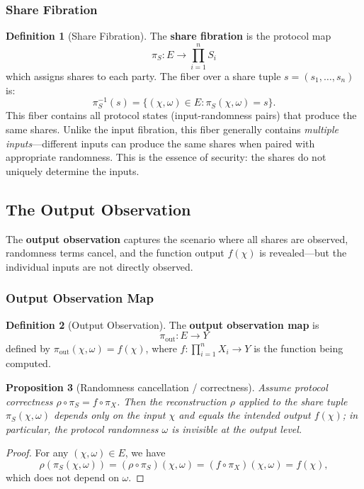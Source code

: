 \documentclass[11pt,a4paper]{article}
\theoremstyle{definition}
\newtheorem{definition}{Definition}[section]
\theoremstyle{plain}
\newtheorem{proposition}[definition]{Proposition}
\begin{document}
\subsubsection{Share Fibration}
\begin{definition}[Share Fibration]
\label{def:share-fibration}
The \textbf{share fibration} is the protocol map
\[
\pi_S: E \longrightarrow \prod_{i=1}^n S_i
\]
which assigns shares to each party. The fiber over a share tuple $s = (s_1, \ldots, s_n)$ is:
\[
\pi_S^{-1}(s) = \{(\chi, \omega) \in E : \pi_S(\chi, \omega) = s\}.
\]
This fiber contains all protocol states (input-randomness pairs) that produce the same shares. Unlike the input fibration, this fiber generally contains \emph{multiple inputs}---different inputs can produce the same shares when paired with appropriate randomness. This is the essence of security: the shares do not uniquely determine the inputs.
\end{definition}

\subsection{The Output Observation}

The \textbf{output observation} captures the scenario where all shares are observed, randomness terms cancel, and the function output $f(\chi)$ is revealed---but the individual inputs are not directly observed.

\subsubsection{Output Observation Map}
\begin{definition}[Output Observation]
\label{def:output-fibration}
The \textbf{output observation map} is
\[
\pi_{\mathrm{out}}: E \longrightarrow Y
\]
defined by $\pi_{\mathrm{out}}(\chi, \omega) = f(\chi)$, where $f: \prod_{i=1}^n X_i \to Y$ is the function being computed.
\end{definition}

\begin{proposition}[Randomness cancellation / correctness]
\label{prop:randomness-cancellation}
Assume protocol correctness $\rho \circ \pi_S = f \circ \pi_X$.
Then the reconstruction $\rho$ applied to the share tuple $\pi_S(\chi,\omega)$ depends only on the input $\chi$ and equals the intended output $f(\chi)$; in particular, the protocol randomness $\omega$ is \emph{invisible} at the output level.
\end{proposition}
\begin{proof}
For any $(\chi,\omega)\in E$, we have
\[
\rho(\pi_S(\chi,\omega))=(\rho\circ \pi_S)(\chi,\omega)=(f\circ \pi_X)(\chi,\omega)=f(\chi),
\]
which does not depend on $\omega$.
\end{proof}
\end{document}
